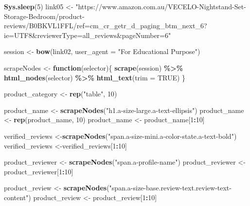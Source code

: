 \documentclass[
]{article}
\newenvironment{Shaded}{\begin{snugshade}}{\end{snugshade}}
\newcommand{\AttributeTok}[1]{\textcolor[rgb]{0.13,0.29,0.53}{#1}}
\newcommand{\ConstantTok}[1]{\textcolor[rgb]{0.56,0.35,0.01}{#1}}
\newcommand{\ControlFlowTok}[1]{\textcolor[rgb]{0.13,0.29,0.53}{\textbf{#1}}}
\newcommand{\DecValTok}[1]{\textcolor[rgb]{0.00,0.00,0.81}{#1}}
\newcommand{\FunctionTok}[1]{\textcolor[rgb]{0.13,0.29,0.53}{\textbf{#1}}}
\newcommand{\NormalTok}[1]{#1}
\newcommand{\OtherTok}[1]{\textcolor[rgb]{0.56,0.35,0.01}{#1}}
\newcommand{\SpecialCharTok}[1]{\textcolor[rgb]{0.81,0.36,0.00}{\textbf{#1}}}
\newcommand{\StringTok}[1]{\textcolor[rgb]{0.31,0.60,0.02}{#1}}
\begin{document}
\begin{Shaded}
\begin{Highlighting}[]
   \FunctionTok{Sys.sleep}\NormalTok{(}\DecValTok{5}\NormalTok{)}
\NormalTok{link05 }\OtherTok{\textless{}{-}} \StringTok{"https://www.amazon.com.au/VECELO{-}Nightstand{-}Set{-}Storage{-}Bedroom/product{-}reviews/B0BKVL1FFL/ref=cm\_cr\_getr\_d\_paging\_btm\_next\_6?ie=UTF8\&reviewerType=all\_reviews\&pageNumber=6"}


\NormalTok{  session }\OtherTok{\textless{}{-}} \FunctionTok{bow}\NormalTok{(link02,}
               \AttributeTok{user\_agent =} \StringTok{"For Educational Purpose"}\NormalTok{)}

\NormalTok{  scrapeNodes }\OtherTok{\textless{}{-}} \ControlFlowTok{function}\NormalTok{(selector)\{}
    \FunctionTok{scrape}\NormalTok{(session) }\SpecialCharTok{\%\textgreater{}\%}
      \FunctionTok{html\_nodes}\NormalTok{(selector) }\SpecialCharTok{\%\textgreater{}\%}
      \FunctionTok{html\_text}\NormalTok{(}\AttributeTok{trim =} \ConstantTok{TRUE}\NormalTok{)}
\NormalTok{  \}}

\NormalTok{  product\_category }\OtherTok{\textless{}{-}} \FunctionTok{rep}\NormalTok{(}\StringTok{"table"}\NormalTok{, }\DecValTok{10}\NormalTok{)}

\NormalTok{  product\_name }\OtherTok{\textless{}{-}} \FunctionTok{scrapeNodes}\NormalTok{(}\StringTok{"h1.a{-}size{-}large.a{-}text{-}ellipsis"}\NormalTok{)}
\NormalTok{  product\_name }\OtherTok{\textless{}{-}} \FunctionTok{rep}\NormalTok{(product\_name, }\DecValTok{10}\NormalTok{)}
\NormalTok{  product\_name }\OtherTok{\textless{}{-}}\NormalTok{ product\_name[}\DecValTok{1}\SpecialCharTok{:}\DecValTok{10}\NormalTok{]}
  
\NormalTok{  verified\_reviews }\OtherTok{\textless{}{-}}\FunctionTok{scrapeNodes}\NormalTok{(}\StringTok{"span.a{-}size{-}mini.a{-}color{-}state.a{-}text{-}bold"}\NormalTok{)}
\NormalTok{  verified\_reviews }\OtherTok{\textless{}{-}}\NormalTok{verified\_reviews[}\DecValTok{1}\SpecialCharTok{:}\DecValTok{10}\NormalTok{]}
  
\NormalTok{  product\_reviewer }\OtherTok{\textless{}{-}} \FunctionTok{scrapeNodes}\NormalTok{(}\StringTok{"span.a{-}profile{-}name"}\NormalTok{)}
\NormalTok{  product\_reviewer }\OtherTok{\textless{}{-}}\NormalTok{ product\_reviewer[}\DecValTok{1}\SpecialCharTok{:}\DecValTok{10}\NormalTok{]}
  
\NormalTok{  product\_review }\OtherTok{\textless{}{-}} \FunctionTok{scrapeNodes}\NormalTok{(}\StringTok{"span.a{-}size{-}base.review{-}text.review{-}text{-}content"}\NormalTok{)}
\NormalTok{  product\_review }\OtherTok{\textless{}{-}}\NormalTok{ product\_review[}\DecValTok{1}\SpecialCharTok{:}\DecValTok{10}\NormalTok{]}
  

\end{Highlighting}
\end{Shaded}
\end{document}
